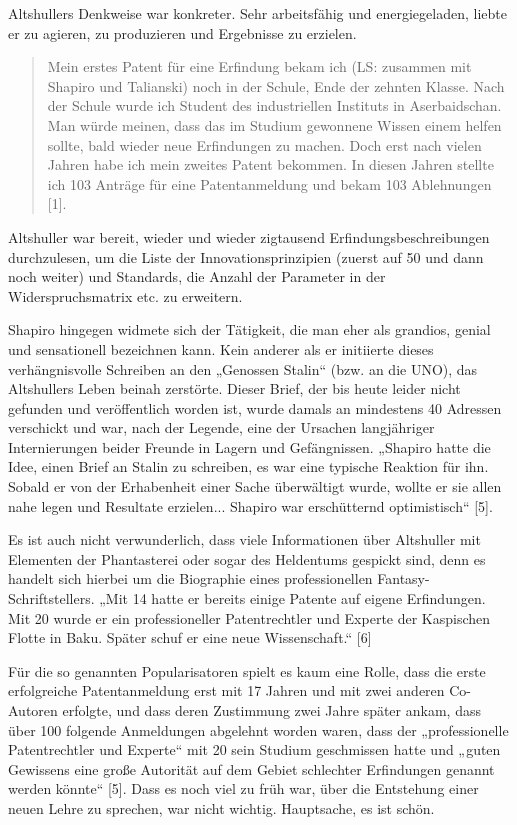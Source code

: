 \documentclass[11pt,a4paper]{article}
\begin{document}
Altshullers Denkweise war konkreter. Sehr arbeitsfähig und energiegeladen,
liebte er zu agieren, zu produzieren und Ergebnisse zu erzielen.  
\begin{quote}
  Mein erstes Patent für eine Erfindung bekam ich (LS: zusammen mit Shapiro
  und Talianski) noch in der Schule, Ende der zehnten Klasse. Nach der Schule
  wurde ich Student des industriellen Instituts in Aserbaidschan.  Man würde
  meinen, dass das im Studium gewonnene Wissen einem helfen sollte, bald
  wieder neue Erfindungen zu machen. Doch erst nach vielen Jahren habe ich
  mein zweites Patent bekommen. In diesen Jahren stellte ich 103 Anträge für
  eine Patentanmeldung und bekam 103 Ablehnungen [1].
\end{quote}
Altshuller war bereit, wieder und wieder zigtausend Erfindungsbeschreibungen
durchzulesen, um die Liste der Innovationsprinzipien (zuerst auf 50 und dann
noch weiter) und Standards, die Anzahl der Parameter in der Widerspruchsmatrix
etc. zu erweitern.

Shapiro hingegen widmete sich der Tätigkeit, die man eher als grandios, genial
und sensationell bezeichnen kann. Kein anderer als er initiierte dieses
verhängnisvolle Schreiben an den „Genossen Stalin“ (bzw. an die UNO), das
Altshullers Leben beinah zerstörte. Dieser Brief, der bis heute leider nicht
gefunden und veröffentlich worden ist, wurde damals an mindestens 40 Adressen
verschickt und war, nach der Legende, eine der Ursachen langjähriger
Internierungen beider Freunde in Lagern und Gefängnissen.  „Shapiro hatte die
Idee, einen Brief an Stalin zu schreiben, es war eine typische Reaktion für
ihn. Sobald er von der Erhabenheit einer Sache überwältigt wurde, wollte er
sie allen nahe legen und Resultate erzielen... Shapiro war erschütternd
optimistisch“ [5].

Es ist auch nicht verwunderlich, dass viele Informationen über Altshuller mit
Elementen der Phantasterei oder sogar des Heldentums gespickt sind, denn es
handelt sich hierbei um die Biographie eines professionellen
Fantasy-Schriftstellers. „Mit 14 hatte er bereits einige Patente auf eigene
Erfindungen. Mit 20 wurde er ein professioneller Patentrechtler und Experte
der Kaspischen Flotte in Baku. Später schuf er eine neue Wissenschaft.“ [6]

Für die so genannten Popularisatoren spielt es kaum eine Rolle, dass die erste
erfolgreiche Patentanmeldung erst mit 17 Jahren und mit zwei anderen
Co-Autoren erfolgte, und dass deren Zustimmung zwei Jahre später ankam, dass
über 100 folgende Anmeldungen abgelehnt worden waren, dass der „professionelle
Patentrechtler und Experte“ mit 20 sein Studium geschmissen hatte und „guten
Gewissens eine große Autorität auf dem Gebiet schlechter Erfindungen genannt
werden könnte“ [5]. Dass es noch viel zu früh war, über die Entstehung einer
neuen Lehre zu sprechen, war nicht wichtig. Hauptsache, es ist schön.
\end{document}
